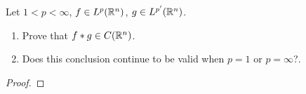 \begin{problem}
Let $1<p<\infty$, $f\in L^p(\mathbb{R}^n)$, $g\in L^{p'}(\mathbb{R}^n)$.
\begin{enumerate}[label=(\alph*),noitemsep]
\item Prove that $f*g\in C(\mathbb{R}^n)$.
\item Does this conclusion continue to be valid when $p=1$ or $p=\infty$?.
\end{enumerate}
\end{problem}
\begin{proof}
\end{proof}

